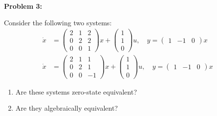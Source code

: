 \documentclass[12pt]{article}
\newenvironment{problem}[1]{
    \textbf{Problem #1:}
}{
    \rmfamily \vspace{1em}
}
\begin{document}
\newpage

\begin{problem}{3}
    Consider the following two systems:
    \[
        \begin{aligned}
            \dot{x} &= \begin{pmatrix}
                2 & 1 & 2 \\
                0 & 2 & 2 \\
                0 & 0 & 1
            \end{pmatrix}x + \begin{pmatrix}
                1 \\
                1 \\
                0
            \end{pmatrix}u, \quad y = \begin{pmatrix}
                1 & -1 & 0
            \end{pmatrix}x \\
            \dot{x} &   = \begin{pmatrix}
                2 & 1 & 1 \\
                0 & 2 & 1 \\
                0 & 0 & -1
            \end{pmatrix}x + \begin{pmatrix}
                1 \\
                1 \\
                0
            \end{pmatrix}u, \quad y = \begin{pmatrix}
                1 & -1 & 0
            \end{pmatrix}x
        \end{aligned}
    \]
    \begin{enumerate}[label=(\alph*)]
        \item Are these systems zero-state equivalent?
        \item Are they algebraically equivalent?
    \end{enumerate}
\end{problem}
\end{document}
